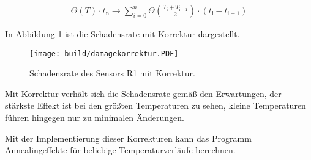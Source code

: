 \begin{align}
  \Theta(T) \cdot t_{\mathrm{n}} \rightarrow \sum_{i=0}^n   \Theta \left(\frac{T_{\mathrm{i}} +T_{\mathrm{i-1}}}{2}\right) \cdot  (t_{\mathrm{i}} - t_{\mathrm{i-1}})
\end{align}

In Abbildung \ref{fig:korrektur_damage} ist die Schadensrate mit Korrektur
dargestellt.

\begin{figure}
  \centering
    \texttt{[image: build/damagekorrektur.PDF]}
\caption{Schadensrate des Sensors R1 mit Korrektur.}
\label{fig:korrektur_damage}
\end{figure}


Mit Korrektur verhält sich die Schadensrate gemäß den Erwartungen, der stärkste
Effekt ist bei den größten Temperaturen zu sehen, kleine Temperaturen führen hingegen
nur zu minimalen Änderungen.

Mit der Implementierung dieser Korrekturen kann das Programm Annealingeffekte für
beliebige Temperaturverläufe berechnen.



